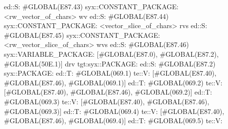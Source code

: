                                                                                 ed::S: #GLOBAL(E87.43) syx::CONSTANT_PACKAGE: <rw_vector_of_chars> wv
                                                                                ed::S: #GLOBAL(E87.44) syx::CONSTANT_PACKAGE: <vector_slice_of_chars> rvs
                                                                                ed::S: #GLOBAL(E87.45) syx::CONSTANT_PACKAGE: <rw_vector_slice_of_chars> wvs
                                                                            ed::S: #GLOBAL(E87.46)
                                                                             syx::VARIABLE_PACKAGE:
                                                                             [#GLOBAL(E87.0), #GLOBAL(E87.2), #GLOBAL(50E.1)]
                                                                             drv
                                                                        tgt:syx::PACKAGE:
                                                                            ed::S: #GLOBAL(E87.2)
                                                                             syx::PACKAGE:
                                                                                ed::T: #GLOBAL(069.1)
                                                                                 te::V:
                                                                                 [#GLOBAL(E87.40), #GLOBAL(E87.46), #GLOBAL(069.1)]
                                                                                ed::T: #GLOBAL(069.2)
                                                                                 te::V:
                                                                                 [#GLOBAL(E87.40), #GLOBAL(E87.46), #GLOBAL(069.2)]
                                                                                ed::T: #GLOBAL(069.3)
                                                                                 te::V:
                                                                                 [#GLOBAL(E87.40), #GLOBAL(E87.46), #GLOBAL(069.3)]
                                                                                ed::T: #GLOBAL(069.4)
                                                                                 te::V:
                                                                                 [#GLOBAL(E87.40), #GLOBAL(E87.46), #GLOBAL(069.4)]
                                                                                ed::T: #GLOBAL(069.5)
                                                                                 te::V:

